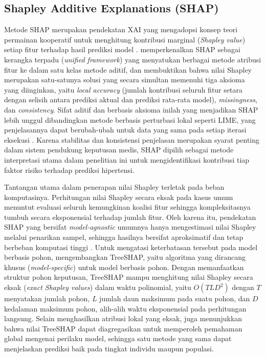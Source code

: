 \subsection{Shapley Additive Explanations (SHAP)}
\label{subsec:landasan-shap}
Metode SHAP merupakan pendekatan XAI yang mengadopsi konsep teori permainan kooperatif untuk menghitung kontribusi marginal (\emph{Shapley value}) setiap fitur terhadap hasil prediksi model \autocite{Lundberg2017Unified}. \textcite{Lundberg2017Unified} memperkenalkan SHAP sebagai kerangka terpadu (\emph{unified framework}) yang menyatukan berbagai metode atribusi fitur ke dalam satu kelas metode aditif, dan membuktikan bahwa nilai Shapley merupakan satu-satunya solusi yang secara simultan memenuhi tiga aksioma yang diinginkan, yaitu \emph{local accuracy} (jumlah kontribusi seluruh fitur setara dengan selisih antara prediksi aktual dan prediksi rata-rata model), \emph{missingness}, dan \emph{consistency}. Sifat aditif dan berbasis aksioma inilah yang menjadikan SHAP lebih unggul dibandingkan metode berbasis perturbasi lokal seperti LIME, yang penjelasannya dapat berubah-ubah untuk data yang sama pada setiap iterasi eksekusi \autocite{molnar2025interpretable}. Karena stabilitas dan konsistensi penjelasan merupakan syarat penting dalam sistem pendukung keputusan medis, SHAP dipilih sebagai metode interpretasi utama dalam penelitian ini untuk mengidentifikasi kontribusi tiap faktor risiko terhadap prediksi hipertensi.

Tantangan utama dalam penerapan nilai Shapley terletak pada beban komputasinya. Perhitungan nilai Shapley secara eksak pada kasus umum menuntut evaluasi seluruh kemungkinan koalisi fitur sehingga kompleksitasnya tumbuh secara eksponensial terhadap jumlah fitur. Oleh karena itu, pendekatan SHAP yang bersifat \emph{model-agnostic} umumnya hanya mengestimasi nilai Shapley melalui penarikan sampel, sehingga hasilnya bersifat aproksimatif dan tetap berbeban komputasi tinggi \autocite{Lundberg2017Unified}. Untuk mengatasi keterbatasan tersebut pada model berbasis pohon, \textcite{Lundberg2020TreeSHAP} mengembangkan TreeSHAP, yaitu algoritma yang dirancang khusus (\emph{model-specific}) untuk model berbasis pohon. Dengan memanfaatkan struktur pohon keputusan, TreeSHAP mampu menghitung nilai Shapley secara eksak (\emph{exact Shapley values}) dalam waktu polinomial, yaitu $O(TLD^2)$ dengan $T$ menyatakan jumlah pohon, $L$ jumlah daun maksimum pada suatu pohon, dan $D$ kedalaman maksimum pohon, alih-alih waktu eksponensial pada perhitungan langsung. Selain menghasilkan atribusi lokal yang eksak, \textcite{Lundberg2020TreeSHAP} juga menunjukkan bahwa nilai TreeSHAP dapat diagregasikan untuk memperoleh pemahaman global mengenai perilaku model, sehingga satu metode yang sama dapat menjelaskan prediksi baik pada tingkat individu maupun populasi.

